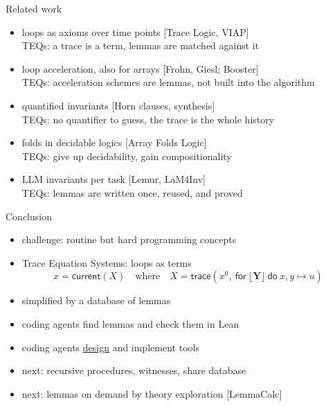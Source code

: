 \documentclass[aspectratio=1610,14pt]{beamer}
\newcommand{\bad}[1]{\textcolor{cred}{#1}}
\newcommand{\good}[1]{\textcolor{cgreen}{#1}}
\newcommand{\concept}[1]{\textcolor{cblue}{#1}}
\newcommand{\cit}[1]{\textcolor{cpurple}{#1}}
\newcommand{\bl}[1]{\lfloor #1\rfloor}
\newcommand{\cur}{\mathsf{current}}
\newcommand{\TRACE}[4]{\mathsf{trace}(#1,\ \mathsf{for}\ #2\ \mathsf{do}\ #3 \mapsto #4)}
\begin{document}
\begin{frame}{Related work}
  \small
  \begin{itemize}
    \setlength{\itemsep}{0.4em}
    \item \concept{loops as axioms} over time points \cit{[Trace Logic, VIAP]}\\
          TEQs: a trace is a \good{term}, lemmas are matched against it
    \item \concept{loop acceleration}, also for arrays \cit{[Frohn, Giesl; Booster]}\\
          TEQs: acceleration schemes are \good{lemmas}, not built into the algorithm
    \item \concept{quantified invariants} \cit{[Horn clauses, synthesis]}\\
          TEQs: \good{no quantifier to guess}, the trace is the whole history
    \item \concept{folds} in decidable logics \cit{[Array Folds Logic]}\\
          TEQs: give up decidability, gain \good{compositionality}
    \item \concept{LLM invariants} per task \cit{[Lemur, LaM4Inv]}\\
          TEQs: lemmas are \good{written once, reused, and proved}
  \end{itemize}
\end{frame}

\begin{frame}{Conclusion}
  \begin{itemize}
    \item \bad{challenge: routine but hard programming concepts}
    \item \concept{Trace Equation Systems}: loops as terms
      \[
        x = \cur(X) \quad \text{where} \quad X = \TRACE{x^0}{\bl{\boldsymbol{Y}}}{x, y}{u}
      \]
    \item simplified by a \concept{database of lemmas} \\[8pt]
      \pause
    \item \good{coding agents find lemmas and check them in Lean}
    \item \good{coding agents \underline{design} and implement tools} \\[8pt]
      \pause
    \item next: recursive procedures, witnesses, share database
    \item next: lemmas on demand by theory exploration \cit{[LemmaCalc]}
  \end{itemize}
\end{frame}
\end{document}
